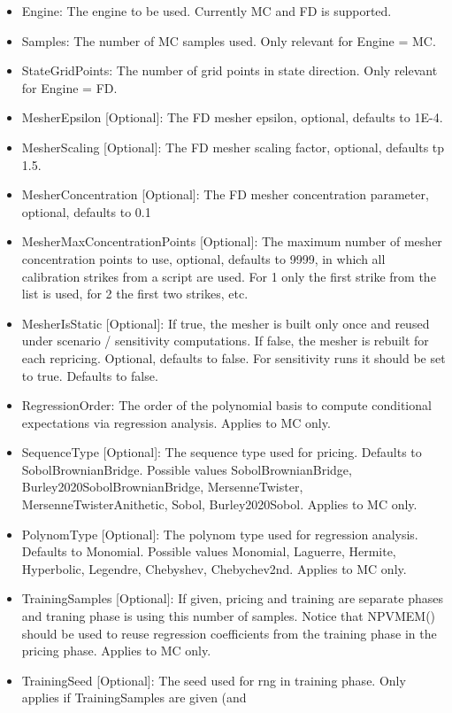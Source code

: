 \begin{itemize}
\item Engine: The engine to be used. Currently MC and FD is supported.
\item Samples: The number of MC samples used. Only relevant for Engine = MC.
\item StateGridPoints: The number of grid points in state direction. Only relevant for Engine = FD.
\item MesherEpsilon [Optional]: The FD mesher epsilon, optional, defaults to 1E-4.
\item MesherScaling [Optional]: The FD mesher scaling factor, optional, defaults tp 1.5.
\item MesherConcentration [Optional]: The FD mesher concentration parameter, optional, defaults to 0.1
\item MesherMaxConcentrationPoints [Optional]: The maximum number of mesher concentration points to use, optional,
  defaults to 9999, in which all calibration strikes from a script are used. For 1 only the first strike from the list
  is used, for 2 the first two strikes, etc.
\item MesherIsStatic [Optional]: If true, the mesher is built only once and reused under scenario / sensitivity
  computations. If false, the mesher is rebuilt for each repricing. Optional, defaults to false. For sensitivity runs it
  should be set to true. Defaults to false.
\item RegressionOrder: The order of the polynomial basis to compute conditional expectations via regression
  analysis. Applies to MC only.
\item SequenceType [Optional]: The sequence type used for pricing. Defaults to SobolBrownianBridge. Possible values
  SobolBrownianBridge, Burley2020SobolBrownianBridge, MersenneTwister, MersenneTwisterAnithetic, Sobol,
  Burley2020Sobol. Applies to MC only.
\item PolynomType [Optional]: The polynom type used for regression analysis. Defaults to Monomial. Possible values
  Monomial, Laguerre, Hermite, Hyperbolic, Legendre, Chebyshev, Chebychev2nd. Applies to MC only.
\item TrainingSamples [Optional]: If given, pricing and training are separate phases and traning phase is using this
  number of samples. Notice that NPVMEM() should be used to reuse regression coefficients from the training phase in the
  pricing phase. Applies to MC only.
\item TrainingSeed [Optional]: The seed used for rng in training phase. Only applies if TrainingSamples are given (and

\end{itemize}
